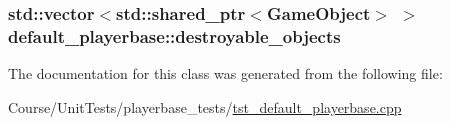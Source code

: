 \hypertarget{classdefault__playerbase_a2d96091c3d07febe37760c9925ec6e1a}{
\subsubsection[{destroyable\-\_\-objects}]{\setlength{\rightskip}{0pt plus 5cm}std\-::vector$<$std\-::shared\-\_\-ptr$<${\bf Game\-Object}$>$ $>$ default\-\_\-playerbase\-::destroyable\-\_\-objects\hspace{0.3cm}{\ttfamily [private]}}}\label{classdefault__playerbase_a2d96091c3d07febe37760c9925ec6e1a}


The documentation for this class was generated from the following file\-:\begin{DoxyCompactItemize}
\item 
Course/\-Unit\-Tests/playerbase\-\_\-tests/\hyperlink{tst__default__playerbase_8cpp}{tst\-\_\-default\-\_\-playerbase.\-cpp}\end{DoxyCompactItemize}
